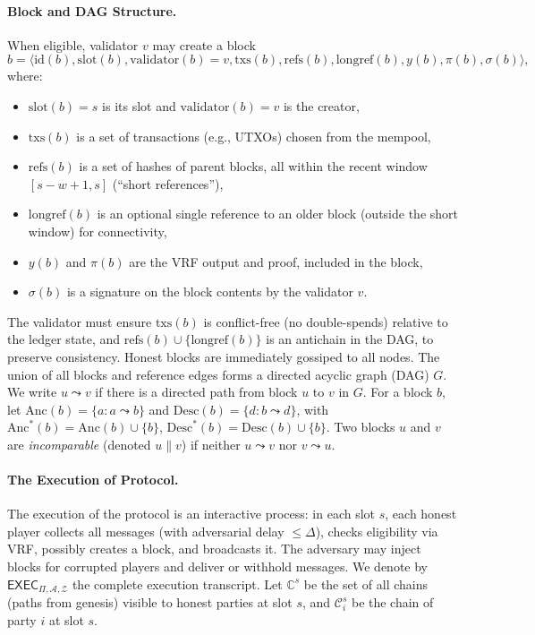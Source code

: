 \documentclass[11pt]{article}
\newcommand{\cZ}{\ensuremath{\mathscr{Z}}\xspace}
\newcommand{\cA}{\ensuremath{\mathscr{A}}\xspace}
\newcommand{\exec}{\ensuremath{\mathsf{EXEC}}\xspace}
\newcommand{\chain}{\ensuremath{\mathcal{C}}\xspace}
\newcommand{\chainset}{\ensuremath{\mathds{C}}\xspace}
\newcommand{\id}{\ensuremath{\mathrm{id}}\xspace}
\newcommand{\val}{\ensuremath{\mathrm{validator}}\xspace}
\newcommand{\slot}{\ensuremath{\mathrm{slot}}\xspace}
\newcommand{\txs}{\ensuremath{\mathrm{txs}}\xspace}
\newcommand{\refs}{\ensuremath{\mathrm{refs}}\xspace}
\newcommand{\longref}{\ensuremath{\mathrm{longref}}\xspace}
\newcommand{\Anc}{\ensuremath{\mathrm{Anc}}\xspace}
\newcommand{\Desc}{\ensuremath{\mathrm{Desc}}\xspace}
\begin{document}
\paragraph{Block and DAG Structure.} When eligible, validator $v$ may create a block
\begin{equation*}
b = \langle \id(b),\slot(b),\val(b)=v,\txs(b),\refs(b),\longref(b),y(b),\pi(b),\sigma(b)\rangle,
\end{equation*}
where:
\begin{itemize}
  \item $\slot(b)=s$ is its slot and $\val(b)=v$ is the creator,
  \item $\txs(b)$ is a set of transactions (e.g., UTXOs) chosen from the mempool,
  \item $\refs(b)$ is a set of hashes of parent blocks, all within the recent window $[s-w+1,s]$ (“short references”),
  \item $\longref(b)$ is an optional single reference to an older block (outside the short window) for connectivity,
  \item $y(b)$ and $\pi(b)$ are the VRF output and proof, included in the block,
  \item $\sigma(b)$ is a signature on the block contents by the validator $v$.
\end{itemize}
The validator must ensure $\txs(b)$ is conflict-free (no double-spends) relative to the ledger state, and $\refs(b)\cup\{\longref(b)\}$ is an antichain in the DAG, to preserve consistency. Honest blocks are immediately gossiped to all nodes. The union of all blocks and reference edges forms a directed acyclic graph (DAG) $G$. We write $u\leadsto v$ if there is a directed path from block $u$ to $v$ in $G$. For a block $b$, let $\Anc(b)=\{a: a\leadsto b\}$ and $\Desc(b)=\{d: b\leadsto d\}$, with $\Anc^*(b)=\Anc(b)\cup\{b\}$, $\Desc^*(b)=\Desc(b)\cup\{b\}$. Two blocks $u$ and $v$ are {\em incomparable} (denoted $u\parallel v$) if neither $u\leadsto v$ nor $v\leadsto u$.

\paragraph{The Execution of Protocol.} The execution of the protocol is an interactive process: in each slot $s$, each honest player collects all messages (with adversarial delay $\le\Delta$), checks eligibility via VRF, possibly creates a block, and broadcasts it. The adversary may inject blocks for corrupted players and deliver or withhold messages. We denote by $\exec_{\Pi,\cA,\cZ}$ the complete execution transcript. Let $\chainset^s$ be the set of all chains (paths from genesis) visible to honest parties at slot $s$, and $\chain_i^s$ be the chain of party $i$ at slot $s$.
\end{document}

